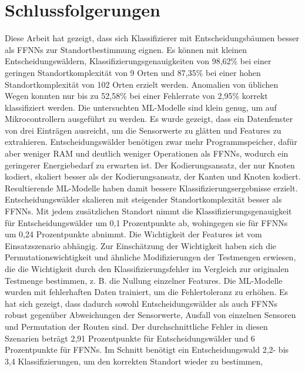 \chapter{Schlussfolgerungen}
Diese Arbeit hat gezeigt, dass sich Klassifizierer mit Entscheidungsbäumen besser als FFNNs zur Standortbestimmung eignen.
Es können mit kleinen Entscheidungswäldern, Klassifizierungsgenauigkeiten von 98,62\% bei einer geringen Standortkomplexität von 9 Orten
und 87,35\% bei einer hohen Standortkomplexität von 102 Orten erzielt werden.
Anomalien von üblichen Wegen konnten nur bis zu 52,58\% bei einer Fehlerrate von 2,95\% korrekt klassifiziert werden.
\newline
\newline
Die untersuchten ML-Modelle sind klein genug, um auf Mikrocontrollern ausgeführt zu werden.
Es wurde gezeigt, dass ein Datenfenster von drei Einträgen ausreicht, um die Sensorwerte zu glätten und Features zu extrahieren.
Entscheidungswälder benötigen zwar mehr Programmspeicher, dafür aber weniger RAM und deutlich weniger Operationen als FFNNs, wodurch
ein geringerer Energiebedarf zu erwarten ist.
\newline
\newline
Der Kodierungsansatz, der nur Knoten kodiert, skaliert besser als der Kodierungsansatz, der Kanten und Knoten kodiert.
Resultierende ML-Modelle haben damit bessere Klassifizierungsergebnisse erzielt.
Entscheidungswälder skalieren mit steigender Standortkomplexität besser als FFNNs.
Mit jedem zusätzlichen Standort nimmt die Klassifizierungsgenauigkeit für Entscheidungswälder um 0,1 Prozentpunkte ab,
wohingegen sie für FFNNs um 0,24 Prozentpunkte abnimmt.
\newline
\newline
Die Wichtigkeit der Features ist vom Einsatzszenario abhängig.
Zur Einschätzung der Wichtigkeit haben sich die Permutationswichtigkeit \cite{breiman2001random} und ähnliche Modifizierungen der Testmengen erwiesen,
die die Wichtigkeit durch den Klassifizierungsfehler im Vergleich zur originalen Testmenge bestimmen, z. B. die Nullung einzelner Features.
\newpage
Die ML-Modelle wurden mit fehlerhaften Daten trainiert, um die Fehlertoleranz zu erhöhen.
Es hat sich gezeigt, dass dadurch sowohl Entscheidungswälder als auch FFNNs robust gegenüber Abweichungen der Sensorwerte,
Ausfall von einzelnen Sensoren und Permutation der Routen sind.
Der durchschnittliche Fehler in diesen Szenarien beträgt 2,91 Prozentpunkte für Entscheidungswälder und 6 Prozentpunkte für FFNNs.
Im Schnitt benötigt ein Entscheidungswald 2,2- bis 3,4 Klassifizierungen, um den korrekten Standort wieder zu bestimmen,
